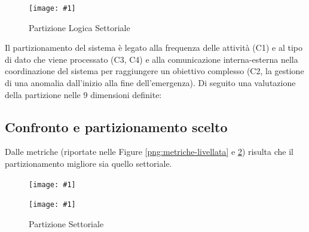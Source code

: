 \documentclass[a4paper,11pt,oneside, table]{article}
\newcommand{\bigimage}[4] {
	\begin{figure}[H]
	    \centering
	    \texttt{[image: \#1]}
	    \caption{#2}\label{#3}
	\end{figure}
}
\newcommand{\putsubimage}[5] {
  \begin{minipage}{{#4}\linewidth}
	    \centering
      \texttt{[image: \#1]}
	    \caption{#2}\label{#3}
	\end{minipage}
}
\newcommand{\putimagecouple}[2] {
  \begin{figure}[!htb]
      \centering
      #1
      \hspace{0.5cm}
      #2
  \end{figure}
}
\begin{document}
\bigimage{images/Diagramma delle Attivita'/Partizione Logica Settoriale.png}{Partizione Logica Settoriale}{png:act:partizione-logica-settoriale}{1}

Il partizionamento del sistema \`e legato alla frequenza delle attivit\`a (C1) e al tipo di dato che viene processato (C3, C4) e alla comunicazione interna-esterna nella coordinazione del sistema per raggiungere un obiettivo complesso (C2, la gestione di una anomalia dall'inizio alla fine dell'emergenza).
Di seguito una valutazione della partizione nelle 9 dimensioni definite:

\begin{center}
\end{center}

\subsection{Confronto e partizionamento scelto}

Dalle metriche (riportate nelle Figure \ref{png:metriche-livellata} e \ref{png:metriche-settoriale}) risulta che il partizionamento migliore sia quello settoriale.

\putimagecouple
{\putsubimage{images/metriche-livellata.png}{Partizione per Livelli}{png:metriche-livellata}{0.45}{1}}
{\putsubimage{images/metriche-settoriale.png}{Partizione Settoriale}{png:metriche-settoriale}{0.45}{1}}
\end{document}
